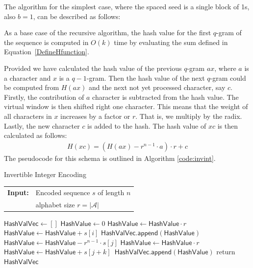 \documentclass[twoside,a4paper,bsc]{master}
\newcommand{\Qgram}[1]{\(#1\)-gram}
\newcommand{\Append}[0]{\mathsf{append}}
\newcommand{\HashValue}[0]{\mathsf{HashValue}}
\newcommand{\HashValVec}[0]{\mathsf{HashValVec}}
\begin{document}
The algorithm for the simplest case, where the spaced seed is a single block of
1s, also \(b=1\), can be described as follows:

As a base case of the recursive algorithm, the hash value for the
first \Qgram{q} of the sequence is computed in \(O(k)\) time by evaluating
the sum defined in Equation~\ref{DefineHfunction}.

Provided we have calculated the hash value of the previous \Qgram{q}
\(ax\), where \(a\) is a character and \(x\) is a \Qgram{q-1}.
Then the hash value
of the next \Qgram{q} could be computed from \(H(ax)\) and the next not yet
processed character, say \(c\). Firstly, the contribution of \(a\)
character is subtracted from the hash value. The virtual window is then
shifted right one character. This means that the weight of all characters
in \(x\) increases by a factor or \(r\). That is, we multiply by the radix.
Lastly, the new character \(c\) is added to the hash.
The hash value of \(xc\) is then calculated as follows:
\begin{align}
H(xc) = (H(ax)-r^{n-1}\cdot a)\cdot r+c\label{IncrementallyComputeH}
\end{align}
The pseudocode for this schema is outlined in Algorithm \ref{code:invint}.
\begin{algorithm}[t]
\caption{Invertible Integer Encoding}
\label{code:invint}
\begin{tabular}{@{}l@{~}l}
\textbf{Input:}&Encoded sequence $s$ of length $n$\\
&alphabet size \(r=|\mathcal{A}|\)\\
\end{tabular}
\begin{algorithmic}
\State \(\HashValVec\gets []\)
\State \(\HashValue \gets 0\)
\State \(\HashValue \gets \HashValue \cdot r\)
\State \(\HashValue \gets \HashValue + s[i]\)
\EndFor
\State \(\HashValVec .\Append(\HashValue)\)
\State \(\HashValue \gets \HashValue - r^{n-1}\cdot s[j]\)
\State \(\HashValue \gets \HashValue \cdot r\)
\State \(\HashValue \gets \HashValue + s[j+k]\)\
\State \(\HashValVec .\Append(\HashValue)\)
\EndFor
\State return \(\HashValVec\)
\end{algorithmic}
\end{algorithm}
\end{document}
